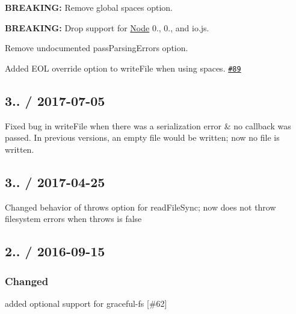 
\begin{DoxyItemize}
\item {\bfseries B\+R\+E\+A\+K\+I\+NG\+:} Remove global {\ttfamily spaces} option.
\item {\bfseries B\+R\+E\+A\+K\+I\+NG\+:} Drop support for \mbox{\hyperlink{classNode}{Node}} 0., 0., and io.\+js.
\item Remove undocumented {\ttfamily pass\+Parsing\+Errors} option.
\item Added {\ttfamily E\+OL} override option to {\ttfamily write\+File} when using {\ttfamily spaces}. \href{https://github.com/jprichardson/node-jsonfile/pull/89}{\tt \#89}
\end{DoxyItemize}

\subsection*{3.. / 2017-\/07-\/05 }


\begin{DoxyItemize}
\item Fixed bug in {\ttfamily write\+File} when there was a serialization error \& no callback was passed. In previous versions, an empty file would be written; now no file is written.
\end{DoxyItemize}

\subsection*{3.. / 2017-\/04-\/25 }


\begin{DoxyItemize}
\item Changed behavior of {\ttfamily throws} option for {\ttfamily read\+File\+Sync}; now does not throw filesystem errors when {\ttfamily throws} is {\ttfamily false}
\end{DoxyItemize}

\subsection*{2.. / 2016-\/09-\/15 }

\subsubsection*{Changed}


\begin{DoxyItemize}
\item added optional support for {\ttfamily graceful-\/fs} \mbox{[}\#62\mbox{]}
\end{DoxyItemize}

